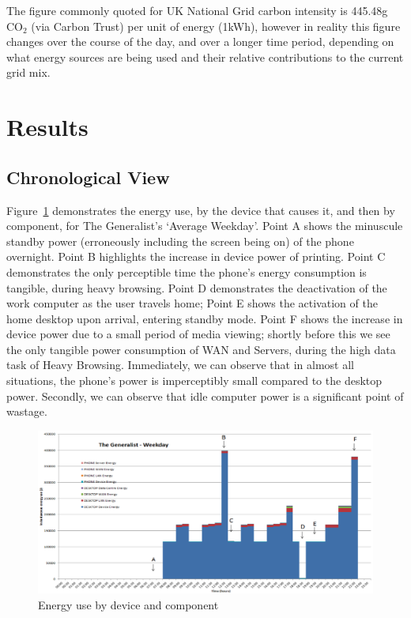 \documentclass[conference]{IEEEtran}
\begin{document}
The figure commonly quoted for UK National Grid carbon intensity is
445.48g CO$_2$ (via Carbon Trust) per unit of energy (1kWh), however
in reality this figure changes over the course of the day, and over a
longer time period, depending on what energy sources are being used
and their relative contributions to the current grid mix.


\section{Results}

\subsection{Chronological View}

Figure~\ref{fig:generalist_weekday} demonstrates the energy use, by
the device that causes it, and then by component, for The Generalist’s
`Average Weekday'. Point A shows the minuscule standby power
(erroneously including the screen being on) of the phone
overnight. Point B highlights the increase in device power of
printing. Point C demonstrates the only perceptible time the phone’s
energy consumption is tangible, during heavy browsing. Point D
demonstrates the deactivation of the work computer as the user travels
home; Point E shows the activation of the home desktop upon arrival,
entering standby mode. Point F shows the increase in device power due
to a small period of media viewing; shortly before this we see the
only tangible power consumption of WAN and Servers, during the high
data task of Heavy Browsing. Immediately, we can observe that in
almost all situations, the phone’s power is imperceptibly small
compared to the desktop power. Secondly, we can observe that idle
computer power is a significant point of wastage.

\begin{figure}[!htp]
\centering
\includegraphics[width=0.9\columnwidth]{images/generalist_weekday.png}
\caption{Energy use by device and component}
\label{fig:generalist_weekday} 
\end{figure}
\end{document}
